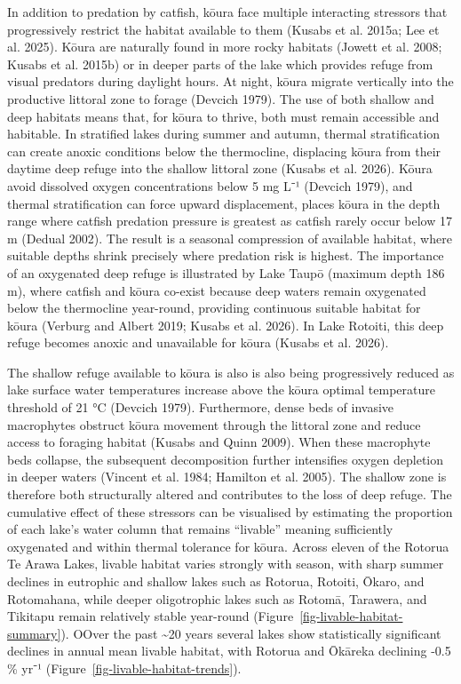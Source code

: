 \documentclass[
  12pt,
  a4paper,
  oneside]{scrbook}
\begin{document}
In addition to predation by catfish, kōura face multiple interacting
stressors that progressively restrict the habitat available to them
(Kusabs et al. 2015a; Lee et al. 2025). Kōura are naturally found in
more rocky habitats (Jowett et al. 2008; Kusabs et al. 2015b) or in
deeper parts of the lake which provides refuge from visual predators
during daylight hours. At night, kōura migrate vertically into the
productive littoral zone to forage (Devcich 1979). The use of both
shallow and deep habitats means that, for kōura to thrive, both must
remain accessible and habitable. In stratified lakes during summer and
autumn, thermal stratification can create anoxic conditions below the
thermocline, displacing kōura from their daytime deep refuge into the
shallow littoral zone (Kusabs et al. 2026). Kōura avoid dissolved oxygen
concentrations below 5 mg L⁻¹ (Devcich 1979), and thermal stratification
can force upward displacement, places kōura in the depth range where
catfish predation pressure is greatest as catfish rarely occur below 17
m (Dedual 2002). The result is a seasonal compression of available
habitat, where suitable depths shrink precisely where predation risk is
highest. The importance of an oxygenated deep refuge is illustrated by
Lake Taupō (maximum depth 186 m), where catfish and kōura co-exist
because deep waters remain oxygenated below the thermocline year-round,
providing continuous suitable habitat for kōura (Verburg and Albert
2019; Kusabs et al. 2026). In Lake Rotoiti, this deep refuge becomes
anoxic and unavailable for kōura (Kusabs et al. 2026).

The shallow refuge available to kōura is also is also being
progressively reduced as lake surface water temperatures increase above
the kōura optimal temperature threshold of 21 °C (Devcich 1979).
Furthermore, dense beds of invasive macrophytes obstruct kōura movement
through the littoral zone and reduce access to foraging habitat (Kusabs
and Quinn 2009). When these macrophyte beds collapse, the subsequent
decomposition further intensifies oxygen depletion in deeper waters
(Vincent et al. 1984; Hamilton et al. 2005). The shallow zone is
therefore both structurally altered and contributes to the loss of deep
refuge. The cumulative effect of these stressors can be visualised by
estimating the proportion of each lake's water column that remains
``livable'' meaning sufficiently oxygenated and within thermal tolerance
for kōura. Across eleven of the Rotorua Te Arawa Lakes, livable habitat
varies strongly with season, with sharp summer declines in eutrophic and
shallow lakes such as Rotorua, Rotoiti, Ōkaro, and Rotomahana, while
deeper oligotrophic lakes such as Rotomā, Tarawera, and Tikitapu remain
relatively stable year-round (Figure~\ref{fig-livable-habitat-summary}).
OOver the past \textasciitilde20 years several lakes show statistically
significant declines in annual mean livable habitat, with Rotorua and
Ōkāreka declining -0.5 \% yr⁻¹
(Figure~\ref{fig-livable-habitat-trends}).
\end{document}
